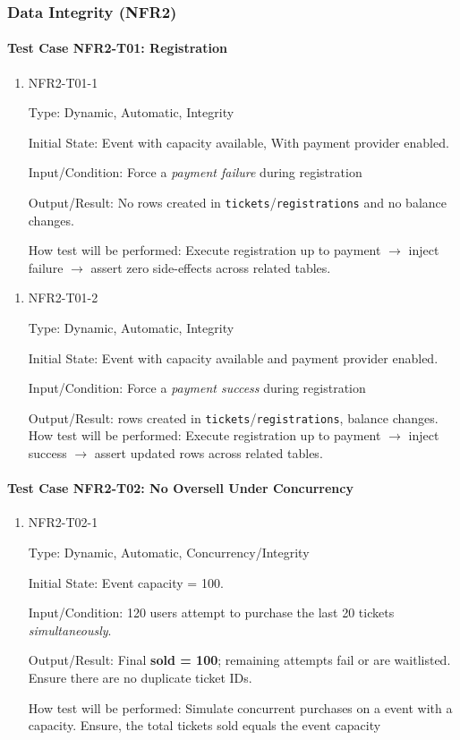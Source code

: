 \documentclass[12pt, titlepage]{article}
\begin{document}
\subsubsection{Data Integrity (NFR2)}

\paragraph{Test Case NFR2-T01: Registration}

\begin{enumerate}
\item{NFR2-T01-1\\}

Type: Dynamic, Automatic, Integrity

Initial State: Event with capacity available, With payment provider enabled.

Input/Condition: Force a \emph{payment failure} during registration 

Output/Result: No rows created in \texttt{tickets}/\texttt{registrations} and no balance changes.

How test will be performed: Execute registration up to payment $\rightarrow$ inject failure $\rightarrow$ assert zero side-effects across related tables.
\end{enumerate}

\begin{enumerate}
\item{NFR2-T01-2\\}

Type: Dynamic, Automatic, Integrity

Initial State: Event with capacity available and payment provider enabled.

Input/Condition: Force a \emph{payment success} during registration 

Output/Result: rows created in \texttt{tickets}/\texttt{registrations}, balance changes.
How test will be performed: Execute registration up to payment $\rightarrow$ inject success $\rightarrow$ assert updated rows across related tables.
\end{enumerate}

\paragraph{Test Case NFR2-T02: No Oversell Under Concurrency}

\begin{enumerate}
\item{NFR2-T02-1\\}

Type: Dynamic, Automatic, Concurrency/Integrity

Initial State: Event capacity = 100.

Input/Condition: 120 users attempt to purchase the last 20 tickets \emph{simultaneously}.

Output/Result: Final \textbf{sold = 100}; remaining attempts fail or are waitlisted. Ensure there are no duplicate ticket IDs.

How test will be performed: Simulate concurrent purchases on a event with a capacity. Ensure, the total tickets sold equals the event capacity
\end{enumerate}
\end{document}
